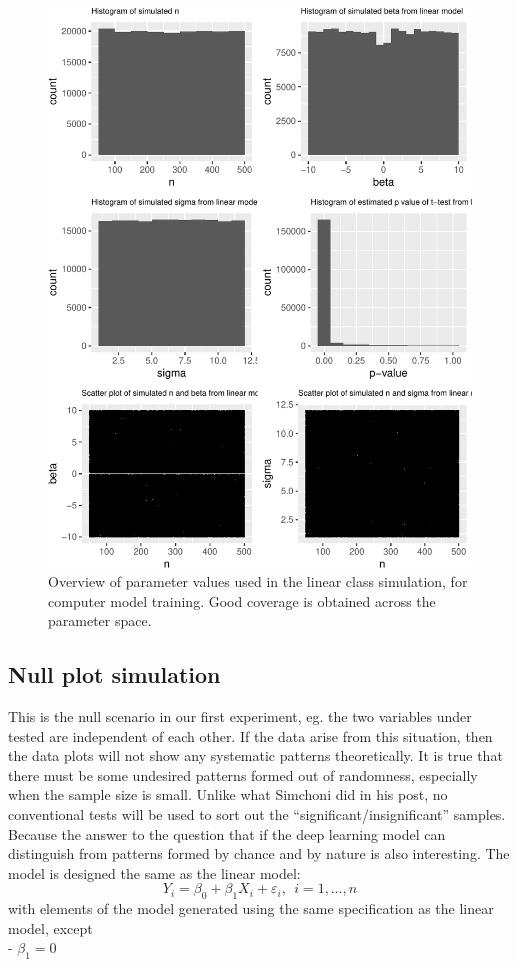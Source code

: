 \documentclass[12pt]{article}
\begin{document}
\begin{figure}
\centering
\includegraphics{pc_plots_files/figure-latex/simplot-1.pdf}
\caption{Overview of parameter values used in the linear class
simulation, for computer model training. Good coverage is obtained
across the parameter space.}
\end{figure}

\subsection{Null plot simulation}\label{null-plot-simulation}

This is the null scenario in our first experiment, eg. the two variables
under tested are independent of each other. If the data arise from this
situation, then the data plots will not show any systematic patterns
theoretically. It is true that there must be some undesired patterns
formed out of randomness, especially when the sample size is small.
Unlike what Simchoni did in his post, no conventional tests will be used
to sort out the ``significant/insignificant'' samples. Because the
answer to the question that if the deep learning model can distinguish
from patterns formed by chance and by nature is also interesting. The
model is designed the same as the linear model:
\[Y_i = \beta_0 + \beta_1 X_{i}  + \varepsilon_i, ~~i=1, \dots , n\]
with elements of the model generated using the same specification as the
linear model, except\\
- \(\beta_1 = 0\)
\end{document}
